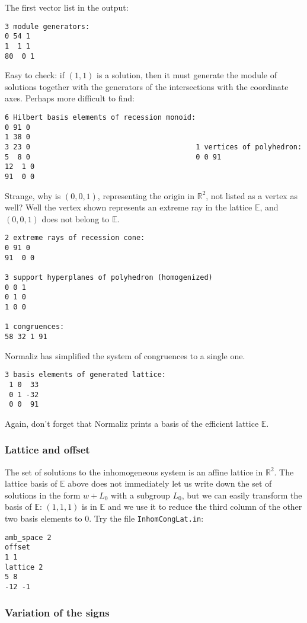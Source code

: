 \documentclass[12pt,a4paper]{scrartcl}
\theoremstyle{definition}
\def\RR{{\mathbb R}}
\def\EE{{\mathbb E}}
\begin{document}
The first vector list in the output:

\begin{Verbatim}
3 module generators:
0 54 1
1  1 1
80  0 1
\end{Verbatim}
Easy to check: if $(1,1)$ is a solution, then it must generate the module of solutions together with the generators of the intersections with the coordinate axes. Perhaps more difficult to find: 
\begin{Verbatim}
6 Hilbert basis elements of recession monoid:
0 91 0
1 38 0
3 23 0                                       1 vertices of polyhedron:
5  8 0                                       0 0 91
12  1 0
91  0 0
\end{Verbatim}
Strange, why is $(0,0,1)$, representing the origin in $\RR^2$, not listed as a vertex as well?
Well the vertex shown represents an extreme ray in the lattice $\EE$, and $(0,0,1)$ does not belong to $\EE$.

\begin{Verbatim}
2 extreme rays of recession cone:
0 91 0
91  0 0

3 support hyperplanes of polyhedron (homogenized)
0 0 1
0 1 0
1 0 0

1 congruences:
58 32 1 91
\end{Verbatim}
Normaliz has simplified the system of congruences to a single one.
\begin{Verbatim}
3 basis elements of generated lattice:
 1 0  33
 0 1 -32
 0 0  91
\end{Verbatim}
Again, don't forget that Normaliz prints a basis of the efficient lattice $\EE$.

\subsubsection{Lattice and offset}\label{offset_ex}

The set of solutions to the inhomogeneous system is an affine lattice in $\RR^2$. The lattice basis of $\EE$ above does not immediately let us write down the set of solutions in the form $w+L_0$ with a subgroup $L_0$, but we can easily transform the basis of $\EE$: $(1,1,1)$ is in $\EE$ and we use it to reduce the third column of the other two basis elements to $0$. Try the file \verb|InhomCongLat.in|:

\begin{Verbatim}
amb_space 2
offset
1 1
lattice 2
5 8
-12 -1
\end{Verbatim}


\subsubsection{Variation of the signs}\label{sign_ex}
\end{document}
